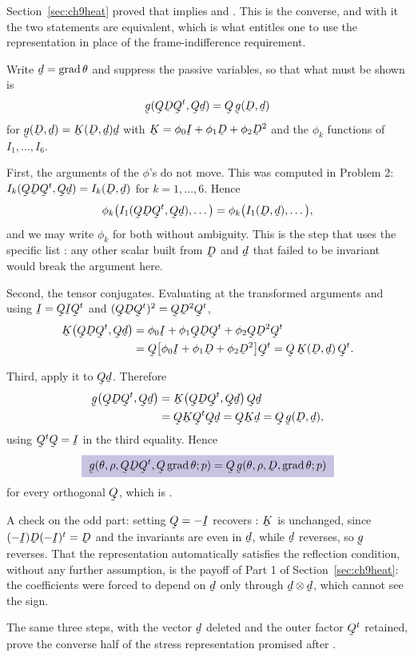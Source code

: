\begin{solution}
Section~\ref{sec:ch9heat} proved that  implies
 and . This is the converse, and with it the two
statements are equivalent, which is what entitles one to use the
representation in place of the frame-indifference requirement.

Write $\bd=\grad\theta$ and suppress the passive variables, so that what
must be shown is
\[
   \bg(\bQ\bD\bQ^{t},\bQ\bd)=\bQ\,\bg(\bD,\bd)
\]
for $\bg(\bD,\bd)=\bK(\bD,\bd)\bd$ with
$\bK=\phi_{0}\I+\phi_{1}\bD+\phi_{2}\bD^{2}$ and the $\phi_{k}$
functions of $I_{1},\ldots,I_{6}$.

First, the arguments of the $\phi$'s do not move. This was
computed in Problem 2: $I_{k}(\bQ\bD\bQ^{t},\bQ\bd)=I_{k}(\bD,\bd)$ for
$k=1,\ldots,6$. Hence
\[
   \phi_{k}\big(I_{1}(\bQ\bD\bQ^{t},\bQ\bd),\ldots\big)
   =\phi_{k}\big(I_{1}(\bD,\bd),\ldots\big),
\]
and we may write $\phi_{k}$ for both without ambiguity. This is the step
that uses the specific list : any other scalar built from
$\bD$ and $\bd$ that failed to be invariant would break the argument
here.

Second, the tensor conjugates. Evaluating  at the
transformed arguments and using $\I=\bQ\I\bQ^{t}$ and
$(\bQ\bD\bQ^{t})^{2}=\bQ\bD^{2}\bQ^{t}$,
\[
\begin{aligned}
   \bK\big(\bQ\bD\bQ^{t},\bQ\bd\big)
   &=\phi_{0}\I+\phi_{1}\bQ\bD\bQ^{t}+\phi_{2}\bQ\bD^{2}\bQ^{t}\\
   &=\bQ\big[\phi_{0}\I+\phi_{1}\bD+\phi_{2}\bD^{2}\big]\bQ^{t}
    =\bQ\,\bK(\bD,\bd)\,\bQ^{t}.
\end{aligned}
\]

Third, apply it to $\bQ\bd$. Therefore
\[
\begin{aligned}
   \bg\big(\bQ\bD\bQ^{t},\bQ\bd\big)
   &=\bK\big(\bQ\bD\bQ^{t},\bQ\bd\big)\,\bQ\bd\\
   &=\bQ\bK\bQ^{t}\bQ\bd
   =\bQ\bK\bd
   =\bQ\,\bg(\bD,\bd),
\end{aligned}
\]
using $\bQ^{t}\bQ=\I$ in the third equality. Hence
\[
   \boxed{\ \bg(\theta,\rho,\bQ\bD\bQ^{t},\bQ\grad\theta;p)
   =\bQ\,\bg(\theta,\rho,\bD,\grad\theta;p)\ }
\]
for every orthogonal $\bQ$, which is .

A check on the odd part: setting $\bQ=-\I$ recovers :
$\bK$ is unchanged, since $(-\I)\bD(-\I)^{t}=\bD$ and the invariants are
even in $\bd$, while $\bd$ reverses, so $\bg$ reverses. That the
representation automatically satisfies the reflection condition, without
any further assumption, is the payoff of Part 1 of
Section~\ref{sec:ch9heat}: the coefficients were forced to depend on
$\bd$ only through $\bd\otimes\bd$, which cannot see the sign.

The same three steps, with the vector $\bd$ deleted and the outer
factor $\bQ^{t}$ retained, prove the converse half of the stress
representation promised after .
\end{solution}

